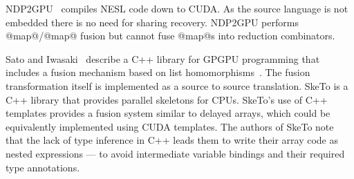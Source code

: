 NDP2GPU~\cite{bergstrom:ndp2gpu} compiles NESL code down to CUDA. As the source language is not embedded there is no need for sharing recovery. NDP2GPU performs @map@/@map@ fusion but cannot fuse @map@s into reduction combinators.

Sato and Iwasaki~\cite{Sato:Skeletal-fusion} describe a C++ library for GPGPU programming that includes a fusion mechanism based on list homomorphisms~\cite{Meijer:bananas}. The fusion transformation itself is implemented as a source to source translation. SkeTo \cite{Matsuzaki:Skeletal-expression-templates} is a C++ library that provides parallel skeletons for CPUs. SkeTo's use of C++ templates provides a fusion system similar to delayed arrays, which could be equivalently implemented using CUDA templates. The authors of SkeTo note that the lack of type inference in C++ leads them to write their array code as nested expressions --- to avoid intermediate variable bindings and their required type annotations.

